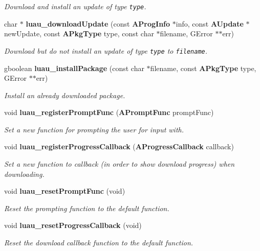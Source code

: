 \begin{CompactItemize}
\begin{CompactList}\small\item\em Download and install an update of type {\tt type}. \item\end{CompactList}\item 
char $\ast$ {\bf luau\_\-download\-Update} (const {\bf AProg\-Info} $\ast$info, const {\bf AUpdate} $\ast$new\-Update, const {\bf APkg\-Type} type, const char $\ast$filename, GError $\ast$$\ast$err)
\begin{CompactList}\small\item\em Download but do not install an update of type {\tt type} to {\tt filename}. \item\end{CompactList}\item 
gboolean {\bf luau\_\-install\-Package} (const char $\ast$filename, const {\bf APkg\-Type} type, GError $\ast$$\ast$err)
\begin{CompactList}\small\item\em Install an already downloaded package. \item\end{CompactList}\item 
void {\bf luau\_\-register\-Prompt\-Func} ({\bf APrompt\-Func} prompt\-Func)
\begin{CompactList}\small\item\em Set a new function for prompting the user for input with. \item\end{CompactList}\item 
void {\bf luau\_\-register\-Progress\-Callback} ({\bf AProgress\-Callback} callback)
\begin{CompactList}\small\item\em Set a new function to callback (in order to show download progress) when downloading. \item\end{CompactList}\item 
void {\bf luau\_\-reset\-Prompt\-Func} (void)
\begin{CompactList}\small\item\em Reset the prompting function to the default function. \item\end{CompactList}\item 
void {\bf luau\_\-reset\-Progress\-Callback} (void)
\begin{CompactList}\small\item\em Reset the download callback function to the default function. \item\end{CompactList}\item 

\end{CompactItemize}

